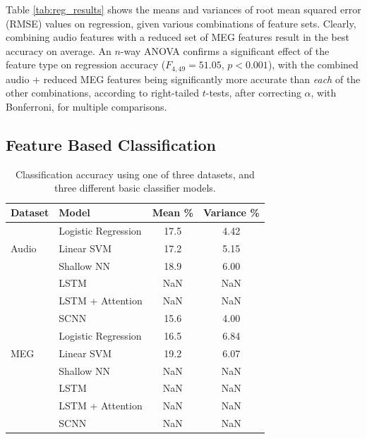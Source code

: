 \documentclass[utf8]{frontiersSCNS} %
\begin{document}
Table \ref{tab:reg_results} shows the means and variances of root mean squared error (RMSE) values on regression, given various combinations of feature sets. Clearly, combining audio features with a reduced set of MEG features result in the best accuracy on average. An $n$-way ANOVA confirms a significant effect of the feature type on regression accuracy ($F_{4,49} = 51.05$, $p<0.001$), with the combined audio + reduced MEG features being significantly more accurate than {\em each} of the other combinations, according to right-tailed $t$-tests, after correcting $\alpha$, with Bonferroni, for multiple comparisons.

\subsection{Feature Based Classification}

\begin{table}[t]
  \centering
  \label{tab:feat_results}
  \begin{tabular}{l l | c | c}
    \toprule
    \textbf{Dataset} & \textbf{Model} & \textbf{Mean \%} & \textbf{Variance \%} \\
    \toprule
    \multirow{3}{*}{Audio}
                     & Logistic Regression & 17.5 & 4.42  \\
                     & Linear SVM          & 17.2 & 5.15  \\
                     & Shallow NN          & 18.9 & 6.00  \\
                     & LSTM                & NaN & NaN  \\
                     & LSTM + Attention    & NaN & NaN  \\
                     & SCNN                & 15.6 & 4.00  \\
    \midrule
    \multirow{3}{*}{MEG}
                     & Logistic Regression & 16.5 & 6.84  \\
                     & Linear SVM          & 19.2 & 6.07  \\
                     & Shallow NN          & NaN & NaN  \\
                     & LSTM                & NaN & NaN  \\
                     & LSTM + Attention    & NaN & NaN  \\
                     & SCNN                & NaN & NaN  \\
    \bottomrule
  \end{tabular}
  \caption{Classification accuracy using one of three datasets, and three different basic classifier models.}
\end{table}
\end{document}
